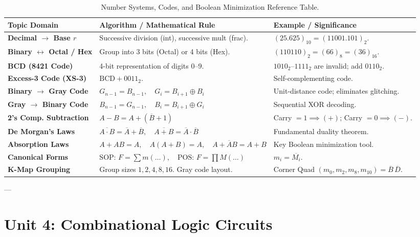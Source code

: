 \begin{table}[htbp]
\centering
\small
\begin{tabularx}{\textwidth}{lXX}
\toprule
\textbf{Topic Domain} & \textbf{Algorithm / Mathematical Rule} & \textbf{Example / Significance} \\
\midrule
\textbf{Decimal $\rightarrow$ Base $r$} & Successive division (int), successive mult (frac). & $(25.625)_{10} = (11001.101)_2$. \\
\textbf{Binary $\leftrightarrow$ Octal / Hex} & Group into 3 bits (Octal) or 4 bits (Hex). & $(110110)_2 = (66)_8 = (36)_{16}$. \\
\textbf{BCD (8421 Code)} & 4-bit representation of digits $0\text{--}9$. & $1010_2\text{--}1111_2$ are invalid; add $0110_2$. \\
\textbf{Excess-3 Code (XS-3)} & $\text{BCD} + 0011_2$. & Self-complementing code. \\
\textbf{Binary $\rightarrow$ Gray Code} & $G_{n-1} = B_{n-1}, \quad G_i = B_{i+1} \oplus B_i$ & Unit-distance code; eliminates glitching. \\
\textbf{Gray $\rightarrow$ Binary Code} & $B_{n-1} = G_{n-1}, \quad B_i = B_{i+1} \oplus G_i$ & Sequential XOR decoding. \\
\textbf{2's Comp. Subtraction} & $A - B = A + (\overline{B} + 1)$ & Carry $= 1 \implies (+)$; Carry $= 0 \implies (-)$. \\
\textbf{De Morgan's Laws} & $\overline{A \cdot B} = \overline{A} + \overline{B}, \quad \overline{A + B} = \overline{A} \cdot \overline{B}$ & Fundamental duality theorem. \\
\textbf{Absorption Laws} & $A + AB = A, \quad A(A + B) = A, \quad A + \overline{A}B = A + B$ & Key Boolean minimization tool. \\
\textbf{Canonical Forms} & $\text{SOP: } F = \sum m(\dots), \quad \text{POS: } F = \prod M(\dots)$ & $m_i = \overline{M_i}$. \\
\textbf{K-Map Grouping} & Group sizes $1, 2, 4, 8, 16$. Gray code layout. & Corner Quad $(m_0, m_2, m_8, m_{10}) = \overline{B}\,\overline{D}$. \\
\bottomrule
\end{tabularx}
\caption{Number Systems, Codes, and Boolean Minimization Reference Table.}
\label{tab:rev-unit3}
\end{table}

---

\section{Unit 4: Combinational Logic Circuits}

